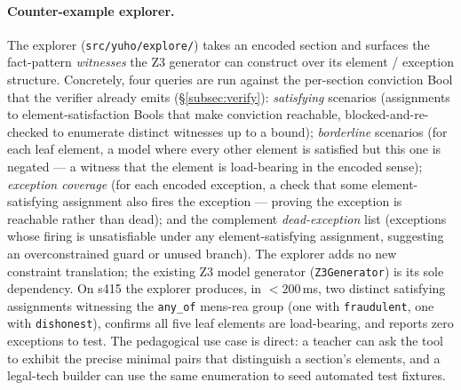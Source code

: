 \paragraph{Counter-example explorer.} The explorer
(\texttt{src/yuho/explore/}) takes an encoded section and surfaces the
fact-pattern \emph{witnesses} the Z3 generator can construct over its
element / exception structure. Concretely, four queries are run
against the per-section conviction Bool that the verifier already
emits (\S\ref{subsec:verify}):
\emph{satisfying} scenarios (assignments to element-satisfaction Bools
that make conviction reachable, blocked-and-re-checked to enumerate
distinct witnesses up to a bound);
\emph{borderline} scenarios (for each leaf element, a model where every
other element is satisfied but this one is negated --- a witness that
the element is load-bearing in the encoded sense);
\emph{exception coverage} (for each encoded exception, a check that
some element-satisfying assignment also fires the exception --- proving
the exception is reachable rather than dead);
and the complement \emph{dead-exception} list (exceptions whose firing
is unsatisfiable under any element-satisfying assignment, suggesting an
overconstrained guard or unused branch).
The explorer adds no new constraint translation; the existing Z3 model
generator (\texttt{Z3Generator}) is its sole dependency. On s415 the
explorer produces, in $<200\,$ms, two distinct satisfying assignments
witnessing the \texttt{any\_of} mens-rea group (one with
\texttt{fraudulent}, one with \texttt{dishonest}), confirms all five
leaf elements are load-bearing, and reports zero exceptions to test.
The pedagogical use case is direct: a teacher can ask the tool to
exhibit the precise minimal pairs that distinguish a section's
elements, and a legal-tech builder can use the same enumeration to
seed automated test fixtures.

